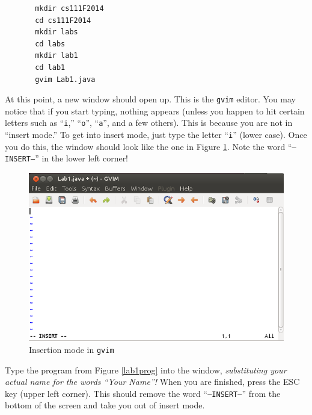 \begin{verbatim}
       mkdir cs111F2014
       cd cs111F2014
       mkdir labs
       cd labs
       mkdir lab1
       cd lab1
       gvim Lab1.java
\end{verbatim}

       At this point, a new window should open up. This is the {\tt gvim} editor.
       You may notice that if you start typing, nothing appears (unless you happen to
         hit certain letters such as ``{\tt i},'' ``{\tt o}'', ``{\tt a}'', and a few
         others). This is because you are not in ``insert mode.'' To get into insert mode,
       just type the letter ``{\tt i}'' (lower case). Once you do this, the window should 
       look like the one in Figure \ref{gvim-insert}. Note the word ``{\tt --INSERT--}''
       in the lower left corner!

       \begin{figure}[htbp]
         \centering
         \includegraphics[width=4.5in]{images/gvim-insert}
         \caption{Insertion mode in {\tt gvim}}
         \label{gvim-insert}
       \end{figure}

       Type the program from Figure
       \ref{lab1prog} into the window, {\em substituting your actual name for the words
         ``Your Name''!} When you are finished, press the ESC key (upper left corner).
       This should remove the word ``{\tt --INSERT--}'' from the bottom of the screen 
       and take you out of insert mode.

